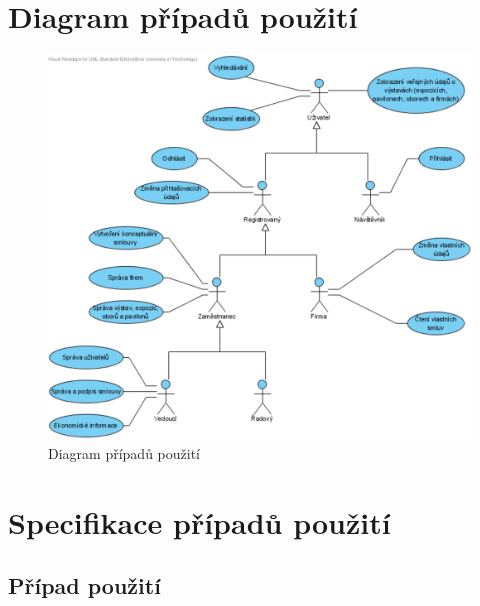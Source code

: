
\section*{Diagram případů použití}

\begin{figure}[H]
	\begin{center}
		\includegraphics[width=12.5cm,keepaspectratio]{include/use_case_stage3}
	\end{center}
	\caption{Diagram případů použití}
\end{figure}

\section*{Specifikace případů použití}

\subsection*{Případ použití }

